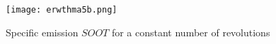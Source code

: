 \documentclass{report}
\begin{document}
\begin{figure}[!h]
\centering
\texttt{[image: erwthma5b.png]}
\caption{Specific emission $SOOT$ for a constant number of revolutions}
\label{fig:ssoote}
\end{figure}










\end{document}
